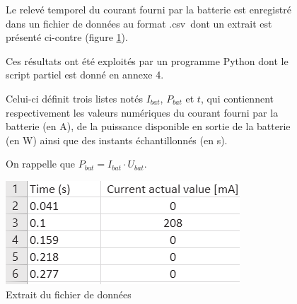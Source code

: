 \begin{figure}[ht!]
\begin{minipage}{0.55\linewidth}
Le relevé temporel du courant fourni par la batterie est enregistré dans un fichier de données au format \og .csv\fg\ dont un extrait est présenté ci-contre (figure \ref{fig07}).

Ces résultats ont été exploités par un programme Python dont le script partiel est donné en annexe 4.

Celui-ci définit trois listes notés $I_{bat}$, $P_{bat}$ et $t$, qui contiennent respectivement les valeurs numériques du courant fourni par la batterie (en A), de la puissance disponible en sortie de la batterie (en W) ainsi que des instants échantillonnés (en s).

On rappelle que $P_{bat}=I_{bat}\cdot U_{bat}$.

\end{minipage}\hfill
\begin{minipage}{0.45\linewidth}
\begin{center}
 \includegraphics[width=0.9\linewidth]{img/fig07}
\end{center}
\caption{\label{fig07} Extrait du fichier de données}
\end{minipage}
\end{figure}


 ~\ \\

